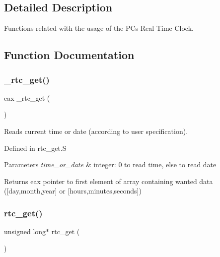 \subsection{Detailed Description}
Functions related with the usage of the PC\textquotesingle{}s Real Time Clock. 



\subsection{Function Documentation}
\hypertarget{group__rtc_gad17bf0ee9de4297ad405b9c197db0eab}{}\label{group__rtc_gad17bf0ee9de4297ad405b9c197db0eab} 
\subsubsection{\texorpdfstring{\+\_\+rtc\+\_\+get()}{\_rtc\_get()}}
{\footnotesize\ttfamily eax \+\_\+rtc\+\_\+get (\begin{DoxyParamCaption}\item[{time\+\_\+or\+\_\+date}]{ }\end{DoxyParamCaption})}



Reads current time or date (according to user specification). 

Defined in rtc\+\_\+get.\+S 
\begin{DoxyParams}{Parameters}
{\em time\+\_\+or\+\_\+date} & integer\+: 0 to read time, else to read date \\
\hline
\end{DoxyParams}
\begin{DoxyReturn}{Returns}
eax pointer to first element of array containing wanted data (\mbox{[}day,month,year\mbox{]} or \mbox{[}hours,minutes,seconds\mbox{]}) 
\end{DoxyReturn}
\hypertarget{group__rtc_ga4ca5626e3ae7e8da1ad9183a7e6aa999}{}\label{group__rtc_ga4ca5626e3ae7e8da1ad9183a7e6aa999} 
\subsubsection{\texorpdfstring{rtc\+\_\+get()}{rtc\_get()}}
{\footnotesize\ttfamily unsigned long$\ast$ rtc\+\_\+get (\begin{DoxyParamCaption}{ }\end{DoxyParamCaption})}



